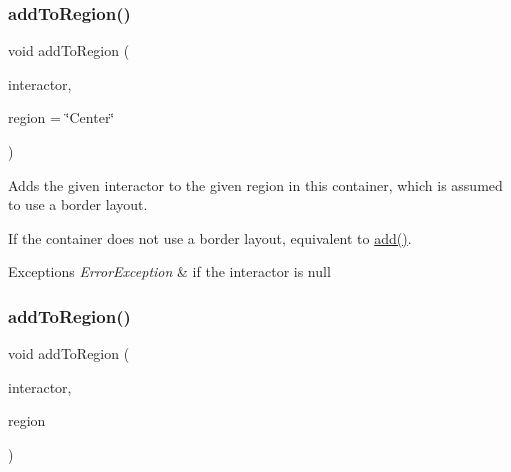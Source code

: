 \subsubsection{\texorpdfstring{add\+To\+Region()}{addToRegion()}\hspace{0.1cm}{\footnotesize\ttfamily [2/4]}}
{\footnotesize\ttfamily void add\+To\+Region (\begin{DoxyParamCaption}\item[{\mbox{\hyperlink{classsgl_1_1GInteractor}{G\+Interactor}} $\ast$}]{interactor,  }\item[{const std\+::string \&}]{region = {\ttfamily \char`\"{}Center\char`\"{}} }\end{DoxyParamCaption})\hspace{0.3cm}{\ttfamily [virtual]}}



Adds the given interactor to the given region in this container, which is assumed to use a border layout. 

If the container does not use a border layout, equivalent to \mbox{\hyperlink{classsgl_1_1GContainer_a6f99b7c841256dbdc5acaafbbca4e685}{add()}}. 
\begin{DoxyExceptions}{Exceptions}
{\em Error\+Exception} & if the interactor is null \\
\hline
\end{DoxyExceptions}
\mbox{\label{classsgl_1_1GContainer_ad05df0d92ab2fba95d401a5614365558}} 
\subsubsection{\texorpdfstring{add\+To\+Region()}{addToRegion()}\hspace{0.1cm}{\footnotesize\ttfamily [3/4]}}
{\footnotesize\ttfamily void add\+To\+Region (\begin{DoxyParamCaption}\item[{\mbox{\hyperlink{classsgl_1_1GInteractor}{G\+Interactor}} \&}]{interactor,  }\item[{\mbox{\hyperlink{classsgl_1_1GContainer_a81a01a86de31071a92e6cce0bab9bc4b}{Region}}}]{region }\end{DoxyParamCaption})\hspace{0.3cm}{\ttfamily [virtual]}}



